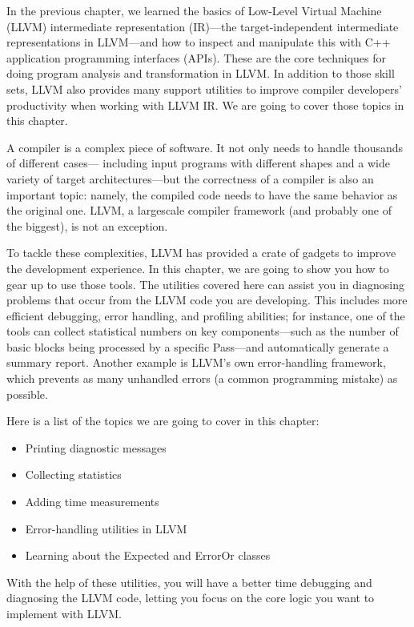 In the previous chapter, we learned the basics of Low-Level Virtual Machine (LLVM) intermediate representation (IR)—the target-independent intermediate representations in LLVM—and how to inspect and manipulate this with C++ application programming interfaces (APIs). These are the core techniques for doing program analysis and transformation in LLVM. In addition to those skill sets, LLVM also provides many support utilities to improve compiler developers' productivity when working with LLVM IR. We are going to cover those topics in this chapter.

A compiler is a complex piece of software. It not only needs to handle thousands of different cases— including input programs with different shapes and a wide variety of target architectures—but the correctness of a compiler is also an important topic: namely, the compiled code needs to have the same behavior as the original one. LLVM, a largescale compiler framework (and probably one of the biggest), is not an exception.

To tackle these complexities, LLVM has provided a crate of gadgets to improve the development experience. In this chapter, we are going to show you how to gear up to use those tools. The utilities covered here can assist you in diagnosing problems that occur from the LLVM code you are developing. This includes more efficient debugging, error handling, and profiling abilities; for instance, one of the tools can collect statistical numbers on key components—such as the number of basic blocks being processed by a specific Pass—and automatically generate a summary report. Another example is LLVM's own error-handling framework, which prevents as many unhandled errors (a common programming mistake) as possible.

Here is a list of the topics we are going to cover in this chapter:

\begin{itemize}
\item Printing diagnostic messages
\item Collecting statistics
\item Adding time measurements
\item Error-handling utilities in LLVM
\item Learning about the Expected and ErrorOr classes
\end{itemize}

With the help of these utilities, you will have a better time debugging and diagnosing the LLVM code, letting you focus on the core logic you want to implement with LLVM.












